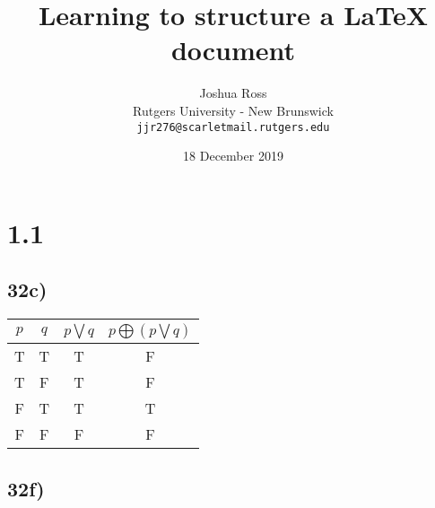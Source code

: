 \documentclass{article}
\begin{document}
\title{Learning to structure a \LaTeX{} document}

\author{Joshua Ross\\
	Rutgers University - New Brunswick\\
	\texttt{jjr276@scarletmail.rutgers.edu}}

\date{18 December 2019}

\maketitle

\section*{1.1}
\subsection*{32c)}
\begin{center}
\begin{tabular}{|c|c|c|c|}
\hline
$p$ & $q$ & $p \bigvee q$ & $p \bigoplus (p \bigvee q)$ \\
\hline
T & T & T & F \\
T & F & T & F \\
F & T & T & T \\
F & F & F & F \\
\hline
\end{tabular}
\end{center}
\subsection*{32f)}
\end{document}
